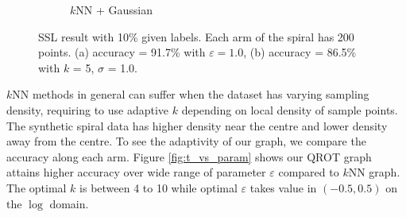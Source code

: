 \documentclass{article}
\begin{document}
\begin{figure}[H]
\begin{subfigure}{0.3\textwidth}
    \caption{$k$NN + Gaussian}
    \end{subfigure}
    \caption{SSL result with 10\% given labels. Each arm of the spiral has 200 points. (a) accuracy = 91.7\% with $\varepsilon=1.0$, (b) accuracy = 86.5\% with $k$ = 5, $\sigma$ = 1.0.}
    \label{fig:Inferred}
\end{figure}

$k$NN methods in general can suffer when the dataset has varying sampling density, requiring to use adaptive $k$ depending on local density of sample points. 
The synthetic spiral data has higher density near the centre and lower density away from the centre. 
To see the adaptivity of our graph, we compare the accuracy along each arm.
Figure \ref{fig:t_vs_param} shows our QROT graph attains higher accuracy over wide range of parameter $\varepsilon$ compared to $k$NN graph.
The optimal $k$ is between 4 to 10 while optimal $\varepsilon$ takes value in $(-0.5, 0.5)$ on the $\log$ domain.
 
\end{document}
